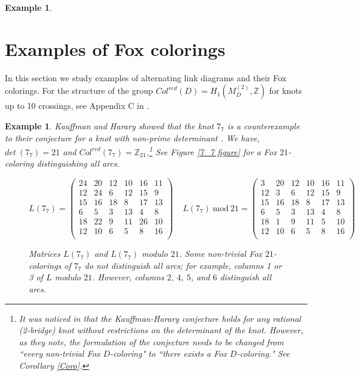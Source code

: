 \documentclass[11pt]{amsart}
\newtheorem{example}[theorem]{Example}
\begin{document}
\begin{example}
\begin{figure}[h]
\end{figure}

\end{example}

\section{Examples of Fox colorings}\label{exfoxsection}

In this section we study examples of alternating link diagrams and their Fox colorings. For the structure of the group $Col^{red}(D)=H_{1}(M_{D}^{(2)}, \mathbb{Z})$ for knots up to 10 crossings, see Appendix C in \cite{BZ}.

\begin{example}

Kauffman and Harary 
 showed that the knot $7_7$ is a counterexample to their conjecture for a knot with non-prime determinant \cite{HK}. We have, $det \ ( 7_7)= 21$ and $Col^{red}(7_7)=\mathbb{Z}_{21}$.\footnote{It was noticed in \cite{KLa} that the Kauffman-Harary conjecture holds for any rational (2-bridge) knot without  restrictions on the determinant of the knot.  However, as they note, the formulation of the conjecture needs to be changed from ``every non-trivial Fox $D$-coloring" to ``there exists a Fox $D$-coloring." See Corollary \ref{Coro}.} See Figure \ref{7_7 figure} for a Fox $21$-coloring distinguishing all arcs.

\begin{figure}[h]
$L(7_7)=\begin{pmatrix}
   24 & 20 & 12 & 10 & 16 & 11 \\
 12 & 24 & 6 & 12 & 15 & 9 \\
 15 & 16 & 18 & 8 & 17 & 13 \\
 6 & 5 & 3 & 13 & 4 & 8 \\
 18 & 22 & 9 & 11 & 26 & 10 \\
 12 & 10 & 6 & 5 & 8 & 16 \\     
\end{pmatrix} \ \ \ \ \ 
L(7_7) \ \text{mod} \ 21=\begin{pmatrix}
   3 & 20 & 12 & 10 & 16 & 11 \\
 12 & 3 & 6 & 12 & 15 & 9 \\
 15 & 16 & 18 & 8 & 17 & 13 \\
 6 & 5 & 3 & 13 & 4 & 8 \\
 18 & 1 & 9 & 11 & 5 & 10 \\
 12 & 10 & 6 & 5 & 8 & 16 \\     
\end{pmatrix} $
\caption{Matrices $L(7_7)$ and $L(7_7)$ modulo $21$. Some non-trivial Fox $21$-colorings of $7_7$ do not distinguish all arcs; for example, columns 1 or 3 of $L$ modulo $21$. However, columns $2$, $4$, $5$, and $6$ distinguish all arcs.}


\end{figure}
\end{example}
\end{document}
